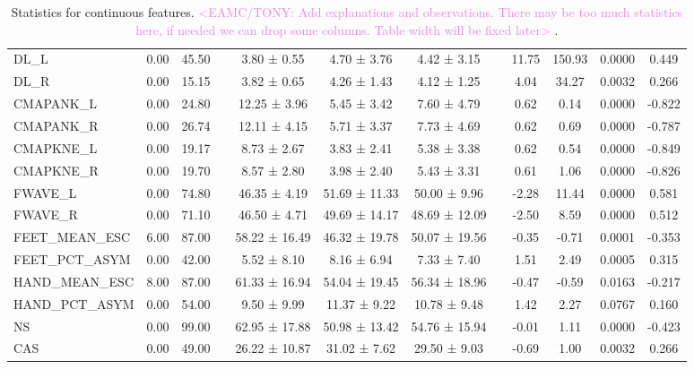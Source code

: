 \documentclass[fleqn,10pt]{wlscirep}
\begin{document}
\begin{table}[t]
\begin{tabular}{lccccccccccc}
DL\_L & 0.00 & 45.50 &  & 3.80 ± 0.55 & 4.70 ± 3.76 & 4.42 ± 3.15 &  & 11.75 & 150.93 & 0.0000 & 0.449 \\
DL\_R & 0.00 & 15.15 &  & 3.82 ± 0.65 & 4.26 ± 1.43 & 4.12 ± 1.25 &  & 4.04 & 34.27 & 0.0032 & 0.266 \\
CMAPANK\_L & 0.00 & 24.80 &  & 12.25 ± 3.96 & 5.45 ± 3.42 & 7.60 ± 4.79 &  & 0.62 & 0.14 & 0.0000 & -0.822 \\
CMAPANK\_R & 0.00 & 26.74 &  & 12.11 ± 4.15 & 5.71 ± 3.37 & 7.73 ± 4.69 &  & 0.62 & 0.69 & 0.0000 & -0.787 \\
CMAPKNE\_L & 0.00 & 19.17 &  & 8.73 ± 2.67 & 3.83 ± 2.41 & 5.38 ± 3.38 &  & 0.62 & 0.54 & 0.0000 & -0.849 \\
CMAPKNE\_R & 0.00 & 19.70 &  & 8.57 ± 2.80 & 3.98 ± 2.40 & 5.43 ± 3.31 &  & 0.61 & 1.06 & 0.0000 & -0.826 \\
FWAVE\_L & 0.00 & 74.80 &  & 46.35 ± 4.19 & 51.69 ± 11.33 & 50.00 ± 9.96 &  & -2.28 & 11.44 & 0.0000 & 0.581 \\
FWAVE\_R & 0.00 & 71.10 &  & 46.50 ± 4.71 & 49.69 ± 14.17 & 48.69 ± 12.09 &  & -2.50 & 8.59 & 0.0000 & 0.512 \\
\midrule
FEET\_MEAN\_ESC & 6.00 & 87.00 &  & 58.22 ± 16.49 & 46.32 ± 19.78 & 50.07 ± 19.56 &  & -0.35 & -0.71 & 0.0001 & -0.353 \\
FEET\_PCT\_ASYM & 0.00 & 42.00 &  & 5.52 ± 8.10 & 8.16 ± 6.94 & 7.33 ± 7.40 &  & 1.51 & 2.49 & 0.0005 & 0.315 \\
HAND\_MEAN\_ESC & 8.00 & 87.00 &  & 61.33 ± 16.94 & 54.04 ± 19.45 & 56.34 ± 18.96 &  & -0.47 & -0.59 & 0.0163 & -0.217 \\
HAND\_PCT\_ASYM & 0.00 & 54.00 &  & 9.50 ± 9.99 & 11.37 ± 9.22 & 10.78 ± 9.48 &  & 1.42 & 2.27 & 0.0767 & 0.160 \\
NS & 0.00 & 99.00 &  & 62.95 ± 17.88 & 50.98 ± 13.42 & 54.76 ± 15.94 &  & -0.01 & 1.11 & 0.0000 & -0.423 \\
CAS & 0.00 & 49.00 &  & 26.22 ± 10.87 & 31.02 ± 7.62 & 29.50 ± 9.03 &  & -0.69 & 1.00 & 0.0032 & 0.266 \\
\bottomrule
\end{tabular}
\caption{Statistics for continuous features.
    \textcolor{violet}{<EAMC/TONY: Add explanations and observations. There may be too much statistics here, if needed we can drop some columns. Table width will be fixed later>
    }.
    }
\label{tab:continuous}
\end{table}
\end{document}
